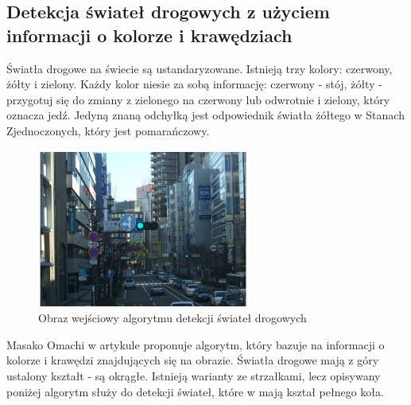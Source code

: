 \subsection{Detekcja świateł drogowych z użyciem informacji o kolorze i krawędziach}
Światła drogowe na świecie są ustandaryzowane. Istnieją trzy kolory: czerwony, żółty i zielony. Każdy kolor niesie za sobą informację: czerwony - stój, żółty - przygotuj się do zmiany z zielonego na czerwony lub odwrotnie i zielony, który oznacza jedź. Jedyną znaną odchyłką jest odpowiednik światła żółtego w Stanach Zjednoczonych, który jest pomarańczowy.

\begin{figure}
  \centering
  \includegraphics[width=7cm]{img/tl_input.png}
  \caption{Obraz wejściowy algorytmu detekcji świateł drogowych\cite{T4}}
  \label{fig:tl_input}
\end{figure}

Masako Omachi w artykule \cite{T4} proponuje algorytm, który bazuje na informacji o kolorze i krawędzi znajdujących się na obrazie. Światła drogowe mają z góry ustalony kształt - są okrągłe. Istnieją warianty ze strzałkami, lecz opisywany poniżej algorytm służy do detekcji świateł, które w \cite{Kodeks} mają kształ pełnego koła.

